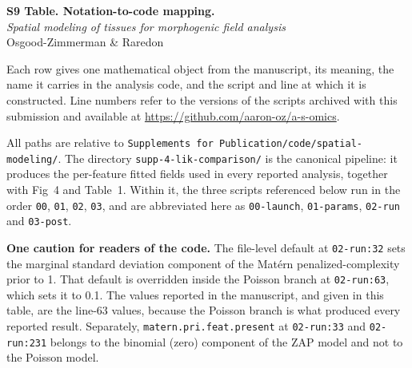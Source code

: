 \documentclass[10pt]{article}
\begin{document}
\begin{center}
{\large\bfseries S9 Table. Notation-to-code mapping.}\\[4pt]
\emph{Spatial modeling of tissues for morphogenic field analysis}\\
Osgood-Zimmerman \& Raredon
\end{center}

\bigskip

Each row gives one mathematical object from the manuscript, its meaning, the name it
carries in the analysis code, and the script and line at which it is constructed. Line
numbers refer to the versions of the scripts archived with this submission and available
at \url{https://github.com/aaron-oz/a-s-omics}.

All paths are relative to
\texttt{Supplements for Publication/code/spatial-modeling/}. The directory
\texttt{supp-4-lik-comparison/} is the canonical pipeline: it produces the per-feature
fitted fields used in every reported analysis, together with Fig~4 and Table~1. Within it,
the three scripts referenced below run in the order \texttt{00}, \texttt{01}, \texttt{02},
\texttt{03}, and are abbreviated here as \texttt{00-launch}, \texttt{01-params},
\texttt{02-run} and \texttt{03-post}.

\medskip

\noindent\textbf{One caution for readers of the code.} The file-level default at
\texttt{02-run:32} sets the marginal standard deviation component of the Mat\'ern
penalized-complexity prior to 1. That default is overridden inside the Poisson branch at
\texttt{02-run:63}, which sets it to 0.1. The values reported in the manuscript, and given
in this table, are the line-63 values, because the Poisson branch is what produced every
reported result. Separately, \texttt{matern.pri.feat.present} at \texttt{02-run:33} and
\texttt{02-run:231} belongs to the binomial (zero) component of the ZAP model and not to
the Poisson model.

\bigskip
\end{document}
